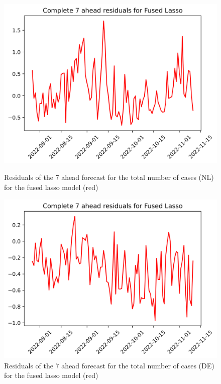 \begin{figure}

\begin{minipage}{.32\textwidth}
  \centering
  \includegraphics[width=\linewidth]{pics/7_ah/7_ahead_errors_Fused Lasso.png}
  \caption{Residuals of the 7 ahead forecast for the total number of cases (NL) for the fused lasso model (red)}
  \label{fig:tot_cases_error_7_flasso}
\end{minipage}
\begin{minipage}{.32\textwidth}
  \centering
  \includegraphics[width=\linewidth]{pics/7_ah/DE_7_ahead_errors_Fused Lasso.png}
  \caption{Residuals of the 7 ahead forecast for the total number of cases (DE) for the fused lasso model (red)}

\end{minipage}
\end{figure}
